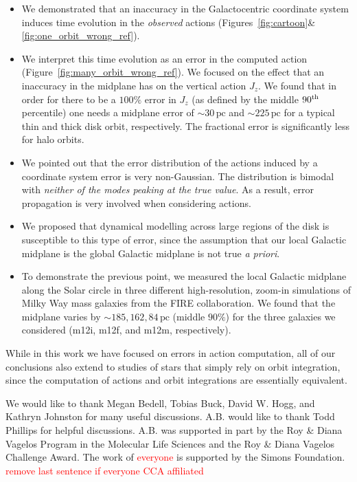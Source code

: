 \documentclass[twocolumn]{aastex62}
\newcommand{\Gus}[1]{\textcolor{red}{#1}}
\newcommand{\pc}{\text{pc}}
\newcommand{\uth}{\textsuperscript{th}}
\begin{document}
\begin{itemize}
\item We demonstrated that an inaccuracy in the Galactocentric coordinate
system induces time evolution in the {\em observed} actions
(Figures~\ref{fig:cartoon}\&\ref{fig:one_orbit_wrong_ref}). 

\item We interpret this time evolution as an error in the computed action
(Figure~\ref{fig:many_orbit_wrong_ref}). We focused on the effect that an
inaccuracy in the midplane has on the vertical action $J_z$. We found that in
order for there to be a $100\%$ error in $J_z$ (as defined by the middle
$90\uth$ percentile) one needs a midplane error of $\sim30\,\pc$ and
$\sim225\,\pc$ for a typical thin and thick disk orbit, respectively. The
fractional error is significantly less for halo orbits.

\item We pointed out that the error distribution of the actions induced by a
coordinate system error is very non-Gaussian. The distribution is bimodal with
{\em neither of the modes peaking at the true value}. As a result, error
propagation is very involved when considering actions.

\item We proposed that dynamical modelling across large regions of the disk is
susceptible to this type of error, since the assumption that our local
Galactic midplane is the global Galactic midplane is not true {\em a priori}.

\item To demonstrate the previous point, we measured the local Galactic
midplane along the Solar circle in three different high-resolution, zoom-in
simulations of Milky Way mass galaxies from the FIRE collaboration. We found
that the midplane varies by $\sim185, 162, 84\,\pc$ (middle $90\%$) for the
three galaxies we considered (m12i, m12f, and m12m, respectively).

\end{itemize}

While in this work we have focused on errors in action computation, all of our
conclusions also extend to studies of stars that simply rely on orbit
integration, since the computation of actions and orbit integrations are
essentially equivalent.

\acknowledgments
We would like to thank Megan Bedell, Tobias Buck, David W. Hogg, and Kathryn
Johnston for many useful discussions. A.B. would like to thank Todd Phillips
for helpful discussions. A.B. was supported in part by the Roy \& Diana
Vagelos Program in the Molecular Life Sciences and the Roy \& Diana Vagelos
Challenge Award. The work of \Gus{everyone} is supported by the Simons
Foundation. \Gus{remove last sentence if everyone CCA affiliated}
\end{document}
